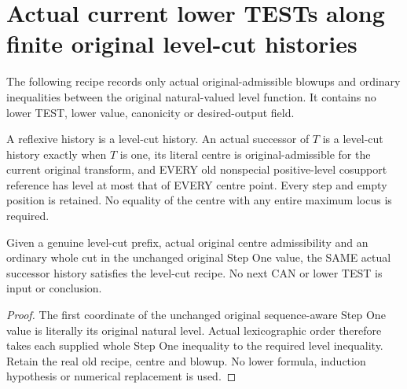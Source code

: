 \section{Actual current lower TESTs along finite original level-cut histories}

The following recipe records only actual original-admissible blowups and
ordinary inequalities between the original natural-valued level function.
It contains no lower TEST, lower value, canonicity or desired-output field.

\begin{definition}
\label{hir:original-finite-level-cut-history}
\leanok
A reflexive history is a level-cut history. An actual successor of $T$
is a level-cut history exactly when $T$ is one, its literal centre is
original-admissible for the current original transform, and EVERY old
nonspecial positive-level cosupport reference has level at most that of
EVERY centre point. Every step and empty position is retained. No equality
of the centre with any entire maximum locus is required.
\end{definition}

\begin{theorem}
\label{hir:original-stepone-cut-supplies-level-cut-history}
\leanok
Given a genuine level-cut prefix, actual original centre admissibility and
an ordinary whole cut in the unchanged original Step One value, the SAME
actual successor history satisfies the level-cut recipe. No next CAN or
lower TEST is input or conclusion.
\end{theorem}
\begin{proof}
The first coordinate of the unchanged original sequence-aware Step One
value is literally its original natural level. Actual lexicographic
order therefore takes each supplied whole Step One inequality to the
required level inequality. Retain the real old recipe, centre and blowup.
No lower formula, induction hypothesis or numerical replacement is used.
\end{proof}


